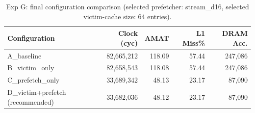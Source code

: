 \begin{table}[H]\centering\small
\begin{tabular}{lrrrr}\toprule
Configuration & Clock (cyc) & AMAT & L1 Miss\% & DRAM Acc. \\ \midrule
A\_baseline & 82,665,212 & 118.09 & 57.44 & 247,086 \\
B\_victim\_only & 82,658,543 & 118.08 & 57.44 & 247,086 \\
C\_prefetch\_only & 33,689,342 & 48.13 & 23.17 & 87,090 \\
D\_victim+prefetch (recommended) & 33,682,036 & 48.12 & 23.17 & 87,090 \\
\bottomrule\end{tabular}
\caption{Exp G: final configuration comparison (selected prefetcher: stream\_d16, selected victim-cache size: 64 entries).}
\label{tab:expG}\end{table}
